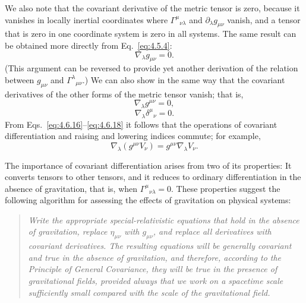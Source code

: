 We also note that the covariant derivative of the metric tensor is zero,
because it vanishes in locally inertial coordinates where
\(\Gamma^\mu{}_{\nu\lambda}\) and \(\partial_\lambda g_{\mu\nu}\) vanish,
and a tensor that is zero in one coordinate system is zero in all systems.
The same result can be obtained more directly from Eq.~\eqref{eq:4.5.4}:
\begin{equation}
  \nabla_\lambda g_{\mu\nu}=0.
  \tag{4.6.16}\label{eq:4.6.16}
\end{equation}
(This argument can be reversed to provide yet another derivation of the
relation between \(g_{\mu\nu}\) and \(\Gamma^\lambda{}_{\mu\nu}\).) We can
also show in the same way that the covariant derivatives of the other forms
of the metric tensor vanish; that is,
\begin{equation}
  \nabla_\lambda g^{\mu\nu}=0,
  \tag{4.6.17}\label{eq:4.6.17}
\end{equation}
\begin{equation}
  \nabla_\lambda\delta^\mu{}_\nu=0.
  \tag{4.6.18}\label{eq:4.6.18}
\end{equation}
From Eqs.~\eqref{eq:4.6.16}--\eqref{eq:4.6.18} it follows that the
operations of covariant differentiation and raising and lowering indices
commute; for example,
\begin{equation}
  \nabla_\lambda(g^{\mu\nu}V_\nu)
  =
  g^{\mu\nu}\nabla_\lambda V_\nu.
  \tag{4.6.19}\label{eq:4.6.19}
\end{equation}

The importance of covariant differentiation arises from two of its
properties: It converts tensors to other tensors, and it reduces to ordinary
differentiation in the absence of gravitation, that is, when
\(\Gamma^\mu{}_{\nu\lambda}=0\). These properties suggest the following
algorithm for assessing the effects of gravitation on physical systems:

\begin{quote}
\itshape
Write the appropriate special-relativistic equations that hold in the
absence of gravitation, replace \(\eta_{\mu\nu}\) with \(g_{\mu\nu}\), and
replace all derivatives with covariant derivatives. The resulting equations
will be generally covariant and true in the absence of gravitation, and
therefore, according to the Principle of General Covariance, they will be
true in the presence of gravitational fields, provided always that we work
on a spacetime scale sufficiently small compared with the scale of the
gravitational field.
\end{quote}
